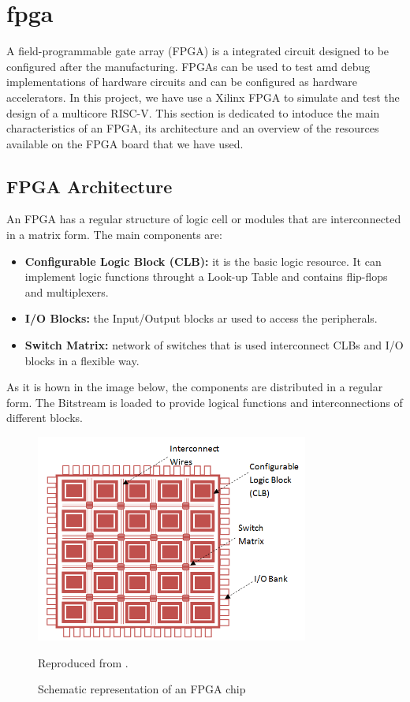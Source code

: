 \section{\gls{fpga}}

A field-programmable gate array (FPGA) is a integrated circuit designed to be configured after the  manufacturing. FPGAs can be used to test amd debug implementations of hardware circuits and can be configured as  hardware accelerators. In this project, we have use a Xilinx FPGA to simulate and test the design of a multicore RISC-V. This section is dedicated to intoduce the main characteristics of an FPGA, its architecture and an overview of the resources available on the FPGA board that we have used. 

\subsection{FPGA Architecture}
An FPGA has a regular structure of logic cell or modules that are interconnected in a matrix form. The main components are:

\begin{itemize}
	\item \textbf{Configurable Logic Block (CLB):} it is the basic logic resource. It can implement logic functions throught a Look-up Table and contains flip-flops and multiplexers. 
	\item \textbf{I/O Blocks:} the Input/Output blocks ar used to access the peripherals. 
	\item \textbf{Switch Matrix:} network of switches that is used interconnect CLBs and I/O blocks in a flexible way.
\end{itemize}

As it is hown in the image below, the components are distributed in a regular  form. The Bitstream is loaded to provide logical functions and interconnections of different blocks. 

\begin{figure}[h]
    \centering
    \includegraphics[width=0.8\textwidth]{../presentation/images/FPGA-Architecture.png}
    \caption{Schematic representation of an FPGA chip} Reproduced from \cite{FPGA}.
    \label{fig:moore}
\end{figure}

